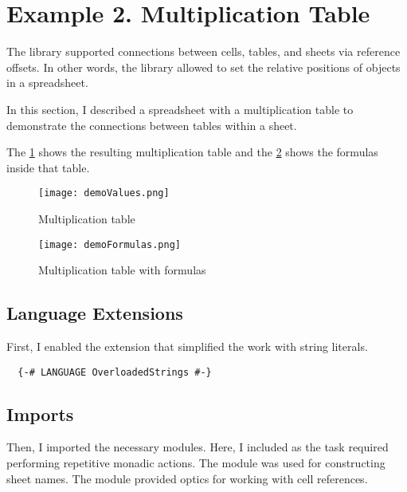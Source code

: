 


\section{Example 2. Multiplication Table}
\label{sec:ex2}

The \clerk library supported connections between cells, tables, and sheets via reference offsets. In other words, the library allowed to set the relative positions of objects in a spreadsheet.

In this section, I described a spreadsheet with a multiplication table to demonstrate the connections between tables within a sheet.

The \cref{example2:tableValues} shows the resulting multiplication table and the \cref{example2:tableFormulas} shows the formulas inside that table.

\begin{figure}[h]
  \centering
  \texttt{[image: demoValues.png]}
  \caption{Multiplication table}
  \label{example2:tableValues}
\end{figure}

\begin{figure}[h]
  \centering
  \texttt{[image: demoFormulas.png]}
  \caption{Multiplication table with formulas}
  \label{example2:tableFormulas}
\end{figure}

\subsection{Language Extensions}

First, I enabled the extension that simplified the work with string literals.

\begin{listing}[!h]
  \begin{verbatim}
  {-# LANGUAGE OverloadedStrings #-}
\end{verbatim}
  \caption{Language extensions}
  \label{example2:languageExtensions}
\end{listing}

\subsection{Imports}

Then, I imported the necessary modules.
Here, I included  as the task required performing repetitive monadic actions.
The module  was used for constructing sheet names.
The  module provided optics for working with cell references.


